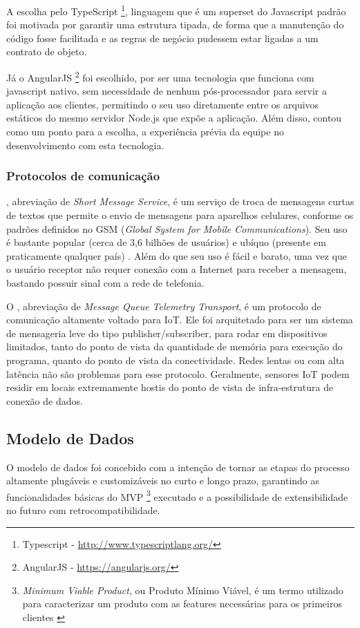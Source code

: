 A escolha pelo TypeScript \footnote{Typescript - \url{http://www.typescriptlang.org/}}, linguagem que é um superset do Javascript padrão foi motivada por garantir uma estrutura tipada, de forma que a manutenção do código fosse facilitada e as regras de negócio pudessem estar ligadas a um contrato de objeto.

Já o AngularJS \footnote{AngularJS - \url{https://angularjs.org/}} foi escolhido, por ser uma tecnologia que funciona com javascript nativo, sem necessidade de nenhum pós-processador para servir a aplicação aos clientes, permitindo o seu uso diretamente entre os arquivos estáticos do mesmo servidor Node.js que expõe a aplicação. Além disso, contou como um ponto para a escolha, a experiência prévia da equipe no desenvolvimento com esta tecnologia.

\subsubsection{Protocolos de comunicação}
\label{protocolos}

\label{sms}, abreviação de \textit{Short Message Service}, é um serviço de troca de mensagens curtas de textos que permite o envio de mensagens para aparelhos celulares, conforme os padrões definidos no GSM (\textit{Global System for Mobile Communications}). Seu uso é bastante popular (cerca de 3,6 bilhões de usuários) \cite{SMS} e ubíquo (presente em praticamente qualquer país) \cite{SMSItu}. Além do que seu uso é fácil e barato, uma vez que o usuário receptor não requer conexão com a Internet para receber a mensagem, bastando possuir sinal com a rede de telefonia.

O \label{mqtt}, abreviação de \textit{Message Queue Telemetry Transport}, é um protocolo de comunicação altamente voltado para IoT. Ele foi arquitetado para ser um sistema de mensageria leve do tipo publisher/subscriber, para rodar em dispositivos limitados, tanto do ponto de vista da quantidade de memória para execução do programa, quanto do ponto de vista da conectividade. Redes lentas ou com alta latência não são problemas para esse protocolo. Geralmente, sensores IoT podem residir em locais extremamente hostis do ponto de vista de infra-estrutura de conexão de dados.

\subsection{Modelo de Dados}
O modelo de dados foi concebido com a intenção de tornar as etapas do processo altamente plugáveis e customizáveis no curto e longo prazo, garantindo as funcionalidades básicas do MVP \footnote{\textit{Minimum Viable Product}, ou Produto Mínimo Viável, é um termo utilizado para caracterizar um produto com as features necessárias para os primeiros clientes \cite{MVP}} executado e a possibilidade de extensibilidade no futuro com retrocompatibilidade. 

